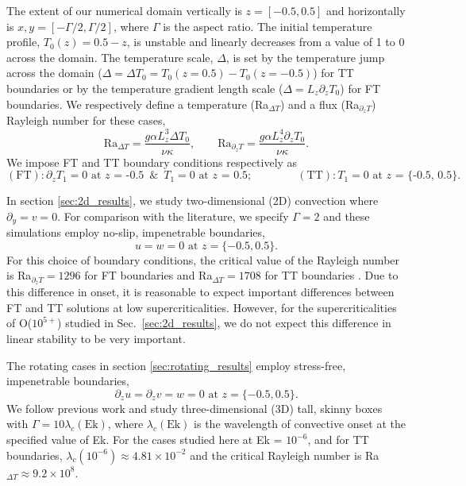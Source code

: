 \documentclass[aps, pre, onecolumn, nofootinbib, notitlepage, groupedaddress, amsfonts, amssymb, amsmath, longbibliography, superscriptaddress]{revtex4-1}
\begin{document}
The extent of our numerical domain vertically is $z = [-0.5, 0.5]$ and horizontally is $x, y = [-\Gamma/2, \Gamma/2]$, where $\Gamma$ is the aspect ratio.
The initial temperature profile, $T_0(z) = 0.5 - z$, is unstable and linearly decreases from a value of 1 to 0 across the domain. 
The temperature scale, $\Delta$, is set by the temperature jump across the domain ($\Delta = \Delta T_0 =  T_0(z=0.5)-T_0(z=-0.5)$) for TT boundaries or by the temperature gradient length scale ($\Delta = L_z \partial_z T_0$) for FT boundaries.
We respectively define a temperature (Ra$_{\Delta T}$) and a flux (Ra$_{\partial_z T}$) Rayleigh number for these cases,
\begin{equation}
\text{Ra}_{\Delta T} = \frac{g \alpha L_z^3 \Delta T_0}{\nu\kappa}, \qquad 
\text{Ra}_{\partial_z T} = \frac{g \alpha L_z^4 \partial_z T_0}{\nu\kappa}.
\end{equation}
We impose FT and TT boundary conditions respectively as
\begin{equation}
(\text{FT}): \partial_z T_1 = 0 \text{ at $z$ = -0.5} \,\,\,\&\,\,\, T_1 = 0 \text{ at $z$ = 0.5};\qquad\qquad
(\text{TT}): T_1 = 0 \text{ at $z$ = \{-0.5, 0.5\}}.
\end{equation}

In section \ref{sec:2d_results}, we study two-dimensional (2D) convection where $\partial_y = v = 0$.
For comparison with the literature, we specify $\Gamma = 2$ and these simulations employ no-slip, impenetrable boundaries,
\begin{equation}
u = w = 0 \, \, \text{at}\,\,z = \{-0.5, 0.5\}.
\label{eqn:vel_bcs}
\end{equation}
For this choice of boundary conditions, the critical value of the Rayleigh number is Ra$_{\partial_z T} = 1296$ for FT boundaries and Ra$_{\Delta T} = 1708$ for TT boundaries \cite{goluskin2016}.
Due to this difference in onset, it is reasonable to expect important differences between FT and TT solutions at low supercriticalities.
However, for the supercriticalities of O($10^{5+}$) studied in Sec.~\ref{sec:2d_results}, we do not expect this difference in linear stability to be very important.

The rotating cases in section \ref{sec:rotating_results} employ stress-free, impenetrable boundaries,
\begin{equation}
\partial_z u = \partial_z v = w = 0 \, \, \text{at}\,\,z = \{-0.5, 0.5\}.
\label{eqn:vel_bcs}
\end{equation}
We follow previous work  \cite{stellmach&all2014} and study three-dimensional (3D) tall, skinny boxes with $\Gamma = 10\lambda_c(\text{Ek})$, where $\lambda_c(\text{Ek})$ is the wavelength of convective onset at the specified value of Ek. 
For the cases studied here at Ek = $10^{-6}$, and for TT boundaries, $\lambda_c(10^{-6}) \approx 4.81 \times 10^{-2}$ and the critical Rayleigh number is Ra$_{\Delta T} \approx 9.2 \times 10^{8}$.
\end{document}
